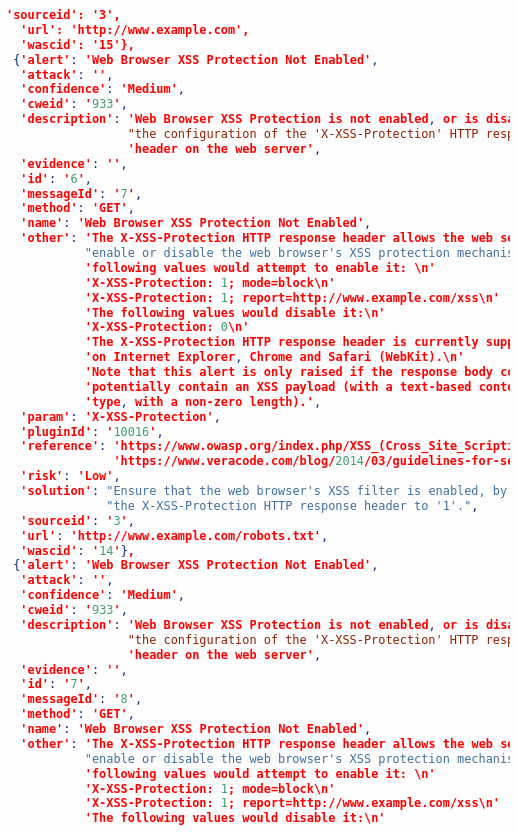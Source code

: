 \begin{lstlisting}[language=json,label={lst:owas_zap_welcome_message_alerts},caption={Alerts showed with NGINX default configuration}]
  'sourceid': '3',
  'url': 'http://www.example.com',
  'wascid': '15'},
 {'alert': 'Web Browser XSS Protection Not Enabled',
  'attack': '',
  'confidence': 'Medium',
  'cweid': '933',
  'description': 'Web Browser XSS Protection is not enabled, or is disabled by '
                 "the configuration of the 'X-XSS-Protection' HTTP response "
                 'header on the web server',
  'evidence': '',
  'id': '6',
  'messageId': '7',
  'method': 'GET',
  'name': 'Web Browser XSS Protection Not Enabled',
  'other': 'The X-XSS-Protection HTTP response header allows the web server to '
           "enable or disable the web browser's XSS protection mechanism. The "
           'following values would attempt to enable it: \n'
           'X-XSS-Protection: 1; mode=block\n'
           'X-XSS-Protection: 1; report=http://www.example.com/xss\n'
           'The following values would disable it:\n'
           'X-XSS-Protection: 0\n'
           'The X-XSS-Protection HTTP response header is currently supported '
           'on Internet Explorer, Chrome and Safari (WebKit).\n'
           'Note that this alert is only raised if the response body could '
           'potentially contain an XSS payload (with a text-based content '
           'type, with a non-zero length).',
  'param': 'X-XSS-Protection',
  'pluginId': '10016',
  'reference': 'https://www.owasp.org/index.php/XSS_(Cross_Site_Scripting)_Prevention_Cheat_Sheet\n'
               'https://www.veracode.com/blog/2014/03/guidelines-for-setting-security-headers/',
  'risk': 'Low',
  'solution': "Ensure that the web browser's XSS filter is enabled, by setting "
              "the X-XSS-Protection HTTP response header to '1'.",
  'sourceid': '3',
  'url': 'http://www.example.com/robots.txt',
  'wascid': '14'},
 {'alert': 'Web Browser XSS Protection Not Enabled',
  'attack': '',
  'confidence': 'Medium',
  'cweid': '933',
  'description': 'Web Browser XSS Protection is not enabled, or is disabled by '
                 "the configuration of the 'X-XSS-Protection' HTTP response "
                 'header on the web server',
  'evidence': '',
  'id': '7',
  'messageId': '8',
  'method': 'GET',
  'name': 'Web Browser XSS Protection Not Enabled',
  'other': 'The X-XSS-Protection HTTP response header allows the web server to '
           "enable or disable the web browser's XSS protection mechanism. The "
           'following values would attempt to enable it: \n'
           'X-XSS-Protection: 1; mode=block\n'
           'X-XSS-Protection: 1; report=http://www.example.com/xss\n'
           'The following values would disable it:\n'

\end{lstlisting}
